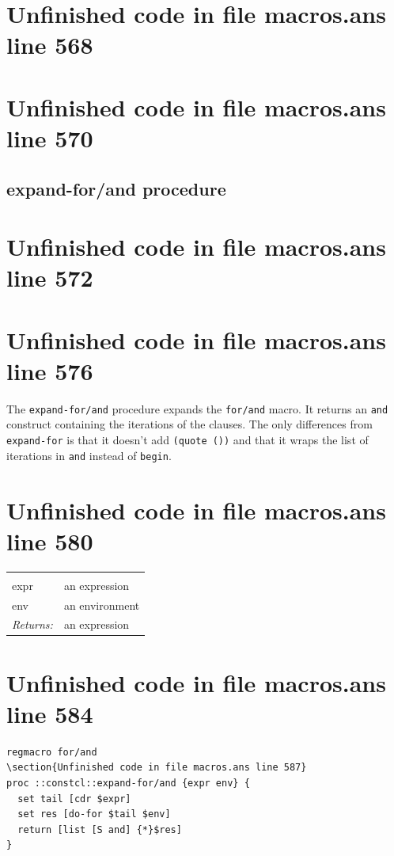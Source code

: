 \documentclass[twoside,9pt]{report}
\begin{document}
\section{Unfinished code in file macros.ans line 568}
\section{Unfinished code in file macros.ans line 570}
\subsection{expand-for/and procedure}
\label{expand-for/and-procedure}
\section{Unfinished code in file macros.ans line 572}

\section{Unfinished code in file macros.ans line 576}

The \texttt{expand-for/and} procedure expands the \texttt{for/and} macro. It returns an \texttt{and} construct containing the iterations of the clauses. The only differences from \texttt{expand-for} is that it doesn't add \texttt{(quote ())} and that it wraps the list of iterations in \texttt{and} instead of \texttt{begin}.

\section{Unfinished code in file macros.ans line 580}
\noindent\begin{tabular}{ |p{1.9cm} p{8cm}| }
\hline
\rowcolor[HTML]{CCCCCC} \multicolumn{2}{|l|}{\bf expand-for/and (internal)} \\
expr & an expression \\
env & an environment \\
\textit{Returns:} & an expression \\
\hline
\end{tabular}
\section{Unfinished code in file macros.ans line 584}
\begin{lstlisting}
regmacro for/and
\section{Unfinished code in file macros.ans line 587}
proc ::constcl::expand-for/and {expr env} {
  set tail [cdr $expr]
  set res [do-for $tail $env]
  return [list [S and] {*}$res]
}
\end{lstlisting}
\end{document}
